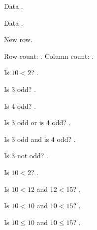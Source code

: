 \documentclass{article}
\begin{document}
Data
.

Data
.

New row.

Row count: .
Column count: .

Is $10 < 2$? .

Is 3 odd? .

Is 4 odd? .

Is 3 odd or is 4 odd? .

Is 3 odd and is 4 odd? .

Is 3 not odd? .

Is $10 < 2$? .

Is $10 < 12$ and $12 < 15$? .

Is $10 < 10$ and $10 < 15$? .

Is $10 \leq 10$ and $10 \leq 15$? .
\end{document}
